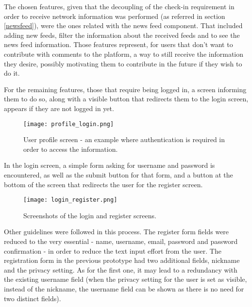 The chosen features, given that the decoupling of the check-in requirement in order to receive network information was performed (as referred in section \ref{newsfeed}), were the ones related with the news feed component. That included adding new feeds, filter the information about the received feeds and to see the news feed information. 
Those features represent, for users that don't want to contribute with comments to the platform, a way to still receive the information they desire, possibly motivating them to contribute in the future if they wish to do it.

For the remaining features, those that require being logged in, a screen informing them to do so, along with a visible button that redirects them to the login screen, appears if they are not logged in yet. 

\begin{figure}[h!]
  \begin{center}
    \leavevmode
    \texttt{[image: profile\_login.png]}
    \caption{User profile screen - an example where authentication is required in order to access the information.}
    \label{fig:auth1}
  \end{center}
\end{figure}

In the login screen, a simple form asking for username and password is encountered, as well as the submit button for that form, and a button at the bottom of the screen that redirects the user for the register screen.

\begin{figure}[h!]
  \begin{center}
    \leavevmode
    \texttt{[image: login\_register.png]}
    \caption{Screenshots of the login and register screens.}
    \label{fig:auth2}
  \end{center}
\end{figure}

Other guidelines were followed in this process. The register form fields were reduced to the very essential - name, username, email, password and password confirmation - in order to reduce the text input effort from the user. The registration form in the previous prototype had two additional fields, nickname and the privacy setting. As for the first one, it may lead to a redundancy with the existing username field (when the privacy setting for the user is set as visible, instead of the nickname, the username field can be shown as there is no need for two distinct fields). 

